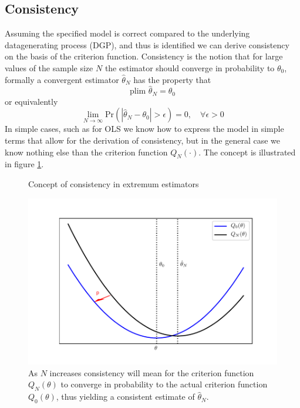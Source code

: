 \subsection{Consistency}
Assuming the specified model is correct compared to the underlying datagenerating process (DGP), and thus is identified we can derive consistency on the basis of the criterion function. Consistency is the notion that for large values of the sample size $N$ the estimator should converge in probability to $\theta_0$, formally a convergent estimator $\hat{\theta}_N$ has the property that
\begin{equation}
\textrm{plim } \hat{\theta}_N = \theta_0
\end{equation}
or equivalently
\begin{equation}
\lim_{N \rightarrow \infty} \textrm{Pr}\left(
 |\hat{\theta}_N - \theta_0|> \epsilon
\right)
= 0, \quad \forall \epsilon > 0
\end{equation}
In simple cases, such as for OLS we know how to express the model in simple terms that allow for the derivation of consistency, but in the general case we know nothing else than the criterion function $Q_N(\cdot)$. The concept is illustrated in figure \ref{fig: consistentextremum}.

\begin{figure}
\caption{Concept of consistency in extremum estimators}
\label{fig: consistentextremum}
\includegraphics[width = \linewidth]{figures/extremumconv}
\caption*{As $N$ increases consistency will mean for the criterion function $Q_N(\theta)$ to converge in probability to the actual criterion function $Q_0(\theta)$, thus yielding a consistent estimate of $\hat{\theta}_N$.}
\end{figure}

